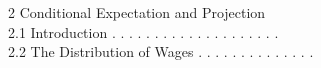 2 Conditional Expectation and Projection\\
2.1 Introduction . . . . . . . . . . . . . . . . . . . .\\
2.2 The Distribution of Wages . . . . . . . . . . . . . .